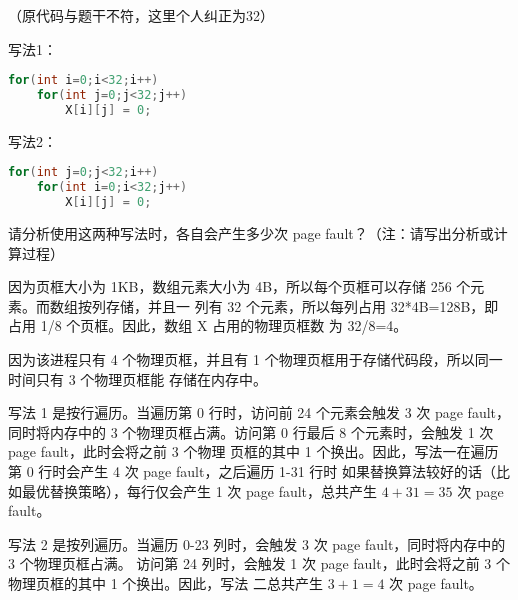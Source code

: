 
（原代码与题干不符，这里个人纠正为32）

写法1：
\begin{lstlisting}[language=C]
for(int i=0;i<32;i++)
    for(int j=0;j<32;j++)
        X[i][j] = 0;
\end{lstlisting}

写法2：
\begin{lstlisting}[language=C]
for(int j=0;j<32;i++)
    for(int i=0;i<32;j++)
        X[i][j] = 0;
\end{lstlisting}

请分析使用这两种写法时，各自会产生多少次 page fault？（注：请写出分析或计算过程）

\begin{solution}

因为页框大小为 1KB，数组元素大小为 4B，所以每个页框可以存储 256 个元素。而数组按列存储，并且一
列有 32 个元素，所以每列占用 32*4B=128B，即占用 1/8 个页框。因此，数组 X 占用的物理页框数
为 32/8=4。

因为该进程只有 4 个物理页框，并且有 1 个物理页框用于存储代码段，所以同一时间只有 3 个物理页框能
存储在内存中。

写法 1 是按行遍历。当遍历第 0 行时，访问前 24 个元素会触发 3 次 page fault，同时将内存中的
3 个物理页框占满。访问第 0 行最后 8 个元素时，会触发 1 次 page fault，此时会将之前 3 个物理
页框的其中 1 个换出。因此，写法一在遍历第 0 行时会产生 4 次 page fault，之后遍历 1-31 行时
如果替换算法较好的话（比如最优替换策略），每行仅会产生 1 次 page fault，总共产生 $4+31=35$
次 page fault。

写法 2 是按列遍历。当遍历 0-23 列时，会触发 3 次 page fault，同时将内存中的 3 个物理页框占满。
访问第 24 列时，会触发 1 次 page fault，此时会将之前 3 个物理页框的其中 1 个换出。因此，写法
二总共产生 $3+1=4$ 次 page fault。


\end{solution}
